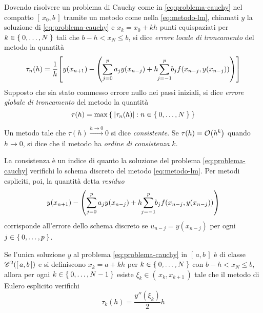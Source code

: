 	\begin{definizione}
		Dovendo risolvere un problema di Cauchy come in \eqref{eq:problema-cauchy} nel compatto \([\, x_0, b \,]\) tramite un metodo  come nella \eqref{eq:metodo-lm}, chiamati \(y\) la soluzione di \eqref{eq:problema-cauchy} e \(x_k = x_0 + k h\) punti equispaziati per \(k \in \Set{0, \dots, N}\) tali che \(b - h < x_N \le b\), si dice \emph{errore locale di troncamento} del metodo la quantità
		\begin{equation}\label{eq:err-loc-tronc}
			\tau_n (h) = \frac{1}{h} \qty[y (x_{n + 1}) - \qty(\sum_{j = 0}^p a_j y (x_{n - j}) + h \sum_{\mathclap{j = - 1}}^p b_j f (x_{n - j}, y (x_{n - j})))]
		\end{equation}
		Supposto che sia stato commesso errore nullo nei passi iniziali, si dice \emph{errore globale di troncamento} del metodo la quantità
		\begin{equation}\label{eq:err-glob-tronc}
			\tau (h) = \max \Set{\abs{\tau_n (h)} : n \in \Set{0, \dots, N}}
		\end{equation}
	
		Un metodo tale che \(\tau (h) \xrightarrow{h \to 0} 0\) si dice \emph{consistente}. Se \(\tau (h) = \order{h^k}\) quando \(h \to 0\), si dice che il metodo ha \emph{ordine di consistenza} \(k\).
	\end{definizione}

	La consistenza è un indice di quanto la soluzione del problema \eqref{eq:problema-cauchy} verifichi lo schema discreto del metodo  \eqref{eq:metodo-lm}. Per metodi espliciti, poi, la quantità detta \emph{residuo}
	\begin{equation*}
		y (x_{n + 1}) - \qty(\sum_{j = 0}^p a_j y (x_{n - j}) + h \sum_{\mathclap{j = - 1}}^p b_j f (x_{n - j}, y (x_{n - j})))
	\end{equation*}
	corrisponde all'errore dello schema discreto se \(u_{n - j} = y (x_{n - j})\) per ogni \(j \in \Set{0, \dots, p}\).
	
	\begin{teorema}\label{th:metodo-eulero-espl-consist}
		Se l'unica soluzione \(y\) al problema \eqref{eq:problema-cauchy} in \([\, a, b \,]\) è di classe \(\mathscr{C}^2 ([\, a, b \,])\) e si definiscono \(x_k = a + k h\) per \(k \in \Set{0, \dots, N}\) con \(b - h < x_N \le b\), allora per ogni \(k \in \Set{0, \dots, N - 1}\) esiste \(\xi_k \in (\, x_k, x_{k + 1} \,)\) tale che il metodo di Eulero esplicito verifichi
		\begin{equation}\label{eq:metodo-eulero-espl-consist}
			\tau_k (h) = \frac{y'' (\xi_k)}{2} h
		\end{equation}
	\end{teorema}

